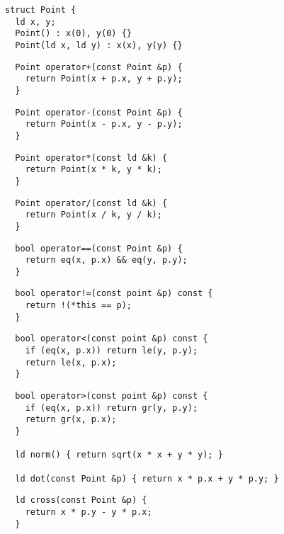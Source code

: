 \documentclass[twoside]{article}
\begin{document}
\begin{multicols*}{2}
\begin{verbatim}
struct Point {
  ld x, y;
  Point() : x(0), y(0) {}
  Point(ld x, ld y) : x(x), y(y) {}
\end{verbatim}
\vspace{-12pt}
\begin{verbatim}
  Point operator+(const Point &p) {
    return Point(x + p.x, y + p.y);
  }
\end{verbatim}
\vspace{-12pt}
\begin{verbatim}
  Point operator-(const Point &p) {
    return Point(x - p.x, y - p.y);
  }
\end{verbatim}
\vspace{-12pt}
\begin{verbatim}
  Point operator*(const ld &k) {
    return Point(x * k, y * k);
  }
\end{verbatim}
\vspace{-12pt}
\begin{verbatim}
  Point operator/(const ld &k) {
    return Point(x / k, y / k);
  }
\end{verbatim}
\vspace{-12pt}
\begin{verbatim}
  bool operator==(const Point &p) {
    return eq(x, p.x) && eq(y, p.y);
  }
\end{verbatim}
\vspace{-12pt}
\begin{verbatim}
  bool operator!=(const point &p) const {
    return !(*this == p);
  }
\end{verbatim}
\vspace{-12pt}
\begin{verbatim}
  bool operator<(const point &p) const {
    if (eq(x, p.x)) return le(y, p.y);
    return le(x, p.x);
  }
\end{verbatim}
\vspace{-12pt}
\begin{verbatim}
  bool operator>(const point &p) const {
    if (eq(x, p.x)) return gr(y, p.y);
    return gr(x, p.x);
  }

  ld norm() { return sqrt(x * x + y * y); }

  ld dot(const Point &p) { return x * p.x + y * p.y; }
\end{verbatim}
\vspace{-12pt}
\begin{verbatim}
  ld cross(const Point &p) {
    return x * p.y - y * p.x;
  }


\end{verbatim}
\end{multicols*}
\end{document}
